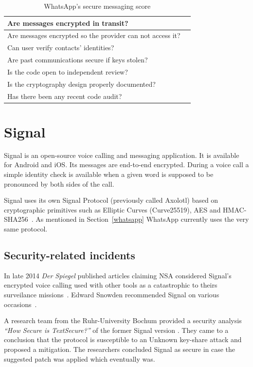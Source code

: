 \documentclass[thesis=M,english]{FITthesis}[2012/10/20]
\newcommand{\cmark}{\ding{51}}%
\newcommand{\xmark}{\ding{55}}%
\begin{document}
\begin{table}[htb]
	\centering
	\caption{WhatsApp's secure messaging score}
	\label{my-label}
	\begin{tabular}{|l|l|}
		\hline
		Are messages encrypted in transit? & \cmark \\\hline
		Are messages encrypted so the provider can not access it? & \cmark \\ \hline
		Can user verify contacts' identities? & \cmark \\ \hline
		Are past communications secure if keys stolen? & \cmark \\ \hline
		Is the code open to independent review? & \xmark \\ \hline
		Is the cryptography design properly documented? & \cmark \\ \hline
		Has there been any recent code audit? & \cmark \\ \hline
	\end{tabular}
\end{table}


\section{Signal}

Signal is an open-source voice calling and messaging application. It is available for Android and iOS. Its messages are end-to-end encrypted. During a voice call a simple identity check is available when a given word is supposed to be pronounced by both sides of the call.

Signal uses its own Signal Protocol (previously called Axolotl) based on cryptographic primitives such as Elliptic Curves (Curve25519), AES and HMAC-SHA256~\cite{signal-bochum}. As mentioned in Section~\ref{whatsapp} WhatsApp currently uses the very same protocol.

\subsection{Security-related incidents}

In late 2014 \emph{Der Spiegel} published articles claiming NSA considered Signal's encrypted voice calling used with other tools as a catastrophic to theirs surveilance missions~\cite{signal-spiegel}. Edward Snowden recommended Signal on various occasions~\cite{signal-snowden,signal-snowden2}.

A research team from the Ruhr-University Bochum provided a security analysis \emph{``How Secure is TextSecure?''} of the former Signal version \cite{signal-bochum}. They came to a conclusion that the protocol is susceptible to an Unknown key-share attack and proposed a mitigation. The researchers concluded Signal as secure in case the suggested patch was applied which eventually was.
\end{document}
